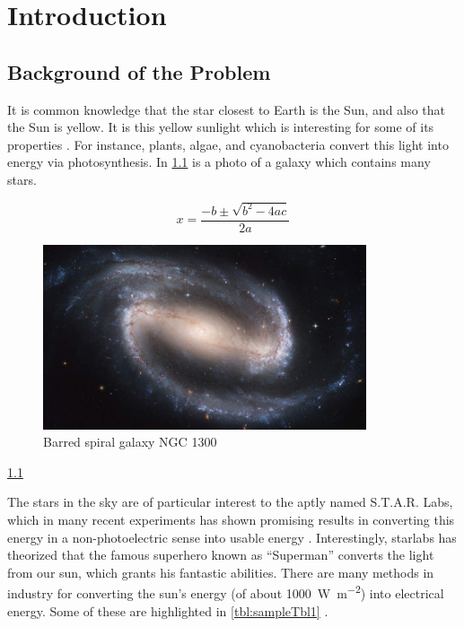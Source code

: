 \chapter{Introduction}
\begin{refsection}
\section{Background of the Problem}

It is common knowledge that the star closest to Earth is the Sun, and also that the Sun is yellow. It is this yellow sunlight which is interesting for some of its properties \cite{onate_exploring_2021} \cite{scholes2011lessons}. For instance, plants, algae, and cyanobacteria convert this light into energy via photosynthesis. In \ref{fig:firstFig} is a photo of a galaxy which contains many stars.


\begin{equation}
	x = \frac{-b \pm \sqrt{b^2 - 4ac}}{2a}
\end{equation}


\begin{figure}[ht]
    \centering
	\includegraphics[width=0.85\textwidth]{figures/sampleFig1.jpg} 
	\caption[Barred spiral galaxy NGC 1300]{Barred spiral galaxy NGC 1300}
	\label{fig:firstFig}
\end{figure}

\ref{fig:firstFig}

The stars in the sky are of particular interest to the aptly named S.T.A.R. Labs, which in many recent experiments has shown promising results in converting this energy in a non-photoelectric sense into usable energy \cite{ssdsdsd_solid_2012}. Interestingly, \gls{starlabs} has theorized that the famous superhero known as ``Superman'' converts the light from our sun, which grants his fantastic abilities. There are many methods in industry for converting the sun's energy (of about \SI{1000}{\watt\per\meter\squared}) into electrical energy. Some of these are highlighted in \ref{tbl:sampleTbl1} \cite{noauthor_techopedia_nodate}.


\end{refsection}
